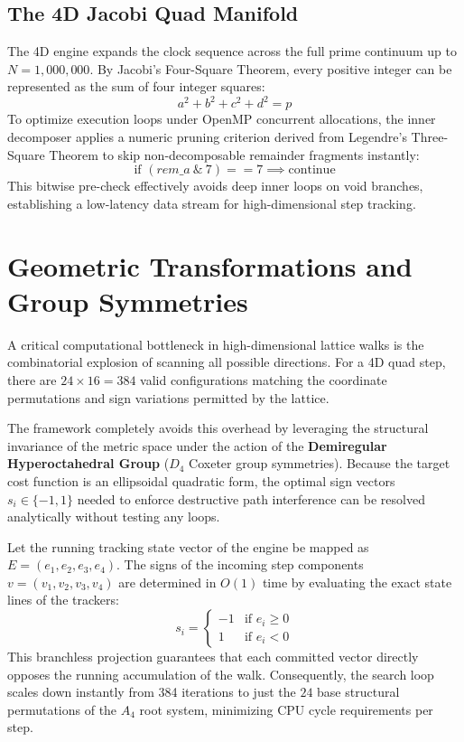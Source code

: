 \documentclass[11pt,a4paper]{article}
\begin{document}
\subsection{The 4D Jacobi Quad Manifold}
The 4D engine expands the clock sequence across the full prime continuum up to $N = 1,000,000$. By Jacobi’s Four-Square Theorem, every positive integer can be represented as the sum of four integer squares:
\begin{equation}
a^2 + b^2 + c^2 + d^2 = p
\end{equation}
To optimize execution loops under OpenMP concurrent allocations, the inner decomposer applies a numeric pruning criterion derived from Legendre's Three-Square Theorem to skip non-decomposable remainder fragments instantly:
\begin{equation}
\text{if } (rem\_a \ \& \ 7) == 7 \implies \text{continue}
\end{equation}
This bitwise pre-check effectively avoids deep inner loops on void branches, establishing a low-latency data stream for high-dimensional step tracking.

\section{Geometric Transformations and Group Symmetries}
A critical computational bottleneck in high-dimensional lattice walks is the combinatorial explosion of scanning all possible directions. For a 4D quad step, there are $24 \times 16 = 384$ valid configurations matching the coordinate permutations and sign variations permitted by the lattice.

The framework completely avoids this overhead by leveraging the structural invariance of the metric space under the action of the \textbf{Demiregular Hyperoctahedral Group} ($D_4$ Coxeter group symmetries). Because the target cost function is an ellipsoidal quadratic form, the optimal sign vectors $s_i \in \{-1, 1\}$ needed to enforce destructive path interference can be resolved analytically without testing any loops. 

Let the running tracking state vector of the engine be mapped as $E = (e_1, e_2, e_3, e_4)$. The signs of the incoming step components $v = (v_1, v_2, v_3, v_4)$ are determined in $O(1)$ time by evaluating the exact state lines of the trackers:
\begin{equation}
s_i = \begin{cases} -1 & \text{if } e_i \ge 0 \\ 1 & \text{if } e_i < 0 \end{cases}
\end{equation}
This branchless projection guarantees that each committed vector directly opposes the running accumulation of the walk. Consequently, the search loop scales down instantly from 384 iterations to just the $24$ base structural permutations of the $A_4$ root system, minimizing CPU cycle requirements per step.
\end{document}
